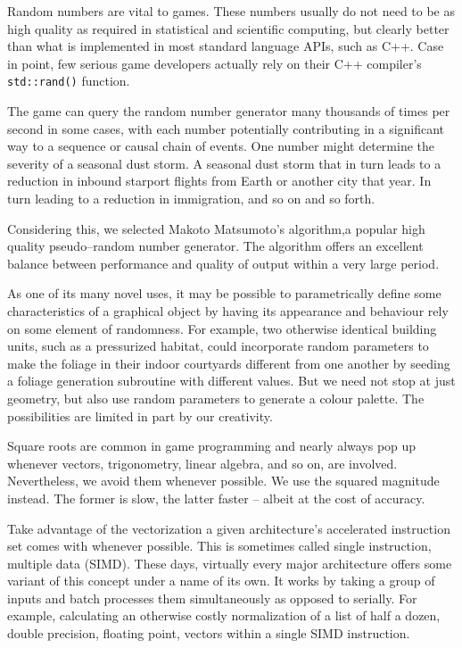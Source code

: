 Random numbers are vital to games. These numbers usually do not need to be as high quality as required in statistical and scientific computing, but clearly better than what is implemented in most standard language APIs, such as C++. Case in point, few serious game developers actually rely on their C++ compiler's {\tt std::rand()} function.

The game can query the random number generator many thousands of times per second in some cases, with each number potentially contributing in a significant way to a sequence or causal chain of events. One number might determine the severity of a seasonal dust storm. A seasonal dust storm that in turn leads to a reduction in inbound starport flights from Earth or another city that year. In turn leading to a reduction in immigration, and so on and so forth.

Considering this, we selected Makoto Matsumoto's algorithm, a popular high quality pseudo--random number generator. The algorithm offers an excellent balance between performance and quality of output within a very large period.

As one of its many novel uses, it may be possible to parametrically define some characteristics of a graphical object by having its appearance and behaviour rely on some element of randomness. For example, two otherwise identical building units, such as a pressurized habitat, could incorporate random parameters to make the foliage in their indoor courtyards different from one another by seeding a foliage generation subroutine with different values. But we need not stop at just geometry, but also use random parameters to generate a colour palette. The possibilities are limited in part by our creativity.

Square roots are common in game programming and nearly always pop up whenever vectors, trigonometry, linear algebra, and so on, are involved. Nevertheless, we avoid them whenever possible. We use the squared magnitude instead. The former is slow, the latter faster -- albeit at the cost of accuracy.

Take advantage of the vectorization a given architecture's accelerated instruction set comes with whenever possible. This is sometimes called single instruction, multiple data (SIMD). These days, virtually every major architecture offers some variant of this concept under a name of its own. It works by taking a group of inputs and batch processes them simultaneously as opposed to serially. For example, calculating an otherwise costly normalization of a list of half a dozen, double precision, floating point, vectors within a single SIMD instruction.

